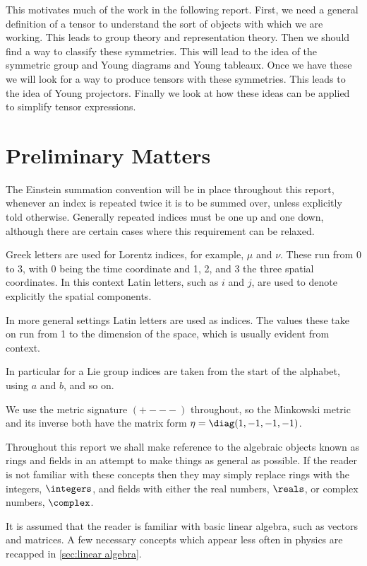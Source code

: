 \documentclass[fleqn]{NotesClass}
\newcommand{\minkowskiMetric}{\eta}
\begin{document}
    This motivates much of the work in the following report.
    First, we need a general definition of a tensor to understand the sort of objects with which we are working.
    This leads to group theory and representation theory.
    Then we should find a way to classify these symmetries.
    This will lead to the idea of the symmetric group and Young diagrams and Young tableaux.
    Once we have these we will look for a way to produce tensors with these symmetries.
    This leads to the idea of Young projectors.
    Finally we look at how these ideas can be applied to simplify tensor expressions.
    
    \section{Preliminary Matters}
    The Einstein summation convention will be in place throughout this report, whenever an index is repeated twice it is to be summed over, unless explicitly told otherwise.
    Generally repeated indices must be one up and one down, although there are certain cases where this requirement can be relaxed.
    
    Greek letters are used for Lorentz indices, for example, \(\mu\) and \(\nu\).
    These run from 0 to 3, with 0 being the time coordinate and 1, 2, and 3 the three spatial coordinates.
    In this context Latin letters, such as \(i\) and \(j\), are used to denote explicitly the spatial components.
    
    In more general settings Latin letters are used as indices.
    The values these take on run from 1 to the dimension of the space, which is usually evident from context.
    
    In particular for a Lie group indices are taken from the start of the alphabet, using \(a\) and \(b\), and so on.
    
    We use the metric signature \(({+}{-}{-}{-})\) throughout, so the Minkowski metric and its inverse both have the matrix form \(\minkowskiMetric = \diag(1, -1, -1, -1)\).
    
    Throughout this report we shall make reference to the algebraic objects known as rings and fields in an attempt to make things as general as possible.
    If the reader is not familiar with these concepts then they may simply replace rings with the integers, \(\integers\), and fields with either the real numbers, \(\reals\), or complex numbers, \(\complex\).
    
    It is assumed that the reader is familiar with basic linear algebra, such as vectors and matrices.
    A few necessary concepts which appear less often in physics are recapped in \cref{sec:linear algebra}.
    
\end{document}
